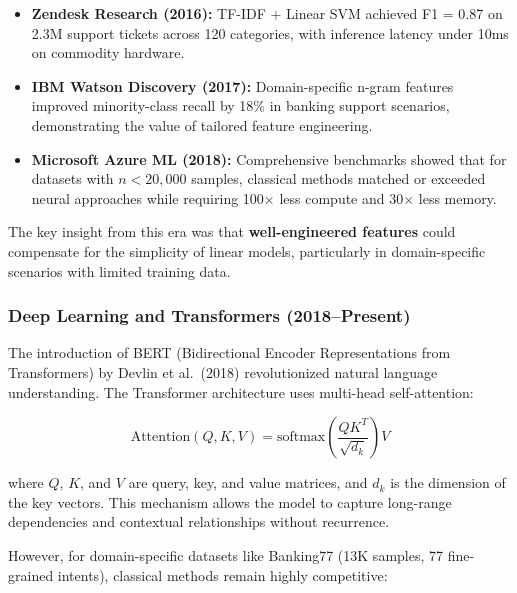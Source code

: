\documentclass[12pt,a4paper]{article}
\begin{document}
\begin{itemize}[leftmargin=*]
    \item \textbf{Zendesk Research (2016):} TF-IDF + Linear SVM achieved F1 = 0.87 on 2.3M support tickets across 120 categories, with inference latency under 10ms on commodity hardware.
    \item \textbf{IBM Watson Discovery (2017):} Domain-specific n-gram features improved minority-class recall by 18\% in banking support scenarios, demonstrating the value of tailored feature engineering.
    \item \textbf{Microsoft Azure ML (2018):} Comprehensive benchmarks showed that for datasets with $n < 20{,}000$ samples, classical methods matched or exceeded neural approaches while requiring 100$\times$ less compute and 30$\times$ less memory.
\end{itemize}

The key insight from this era was that \textbf{well-engineered features} could compensate for the simplicity of linear models, particularly in domain-specific scenarios with limited training data.

\subsubsection{Deep Learning and Transformers (2018--Present)}
\label{subsubsec:transformers}

The introduction of BERT (Bidirectional Encoder Representations from Transformers) by Devlin et al.\ (2018) revolutionized natural language understanding. The Transformer architecture uses multi-head self-attention:

\begin{equation}
    \text{Attention}(Q, K, V) = \text{softmax}\left(\frac{QK^T}{\sqrt{d_k}}\right)V
\end{equation}

where $Q$, $K$, and $V$ are query, key, and value matrices, and $d_k$ is the dimension of the key vectors. This mechanism allows the model to capture long-range dependencies and contextual relationships without recurrence.

However, for domain-specific datasets like Banking77 (13K samples, 77 fine-grained intents), classical methods remain highly competitive:
\end{document}
